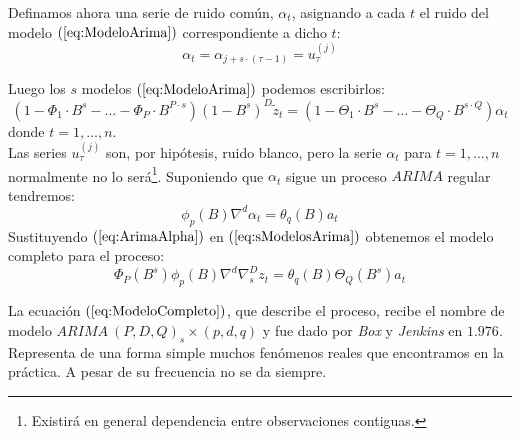 Definamos ahora una serie de ruido com\'un, $\alpha_t$, asignando a cada $t$ el
ruido del modelo $(\ref{eq:ModeloArima})$ correspondiente a dicho $t$:
\begin{displaymath}
\alpha_t = \alpha_{j+s\cdot (\tau-1)} = u_{\tau}^{(j)}
\end{displaymath}

Luego los $s$ modelos $(\ref{eq:ModeloArima})$ podemos escribirlos:
\begin{equation}\label{eq:sModelosArima}
(1-\Phi_1\cdot B^s-\dots-\Phi_P\cdot B^{P\cdot s})(1-B^s)^D\widetilde{z}_t=
(1-\Theta_1\cdot B^s-\dots-\Theta_Q\cdot B^{s\cdot Q})\alpha_t
\end{equation}
donde $t=1,\dots,n$.\\

Las series $u_{\tau}^{(j)}$ son, por hip\'otesis, ruido blanco, pero la serie
$\alpha_t$ para $t=1,\dots,n$ normalmente no lo ser\'a\footnote{Existir\'a en
general dependencia entre observaciones contiguas.}. Suponiendo que $\alpha_t$
sigue un proceso $ARIMA$ regular tendremos:
\begin{equation}\label{eq:ArimaAlpha}
\phi_p(B)\nabla^d\alpha_t=\theta_q(B)a_t
\end{equation}
Sustituyendo $(\ref{eq:ArimaAlpha})$ en $(\ref{eq:sModelosArima})$ obtenemos el
modelo completo para el proceso:
\begin{equation}\label{eq:ModeloCompleto}
\Phi_P(B^s)\phi_p(B)\nabla^d\nabla_s^Dz_t =\theta_q(B)\Theta_Q(B^s)a_t
\end{equation}

La ecuaci\'on $(\ref{eq:ModeloCompleto})$, que describe el proceso, recibe el nombre de modelo
$ARIMA\ (P,D,Q)_s\times (p,d,q)$ y fue dado por \emph{Box} y \emph{Jenkins} en
$1.976$. Representa de una forma simple muchos fen\'omenos reales que
encontramos en la pr\'actica. A pesar de su frecuencia no se da siempre.
